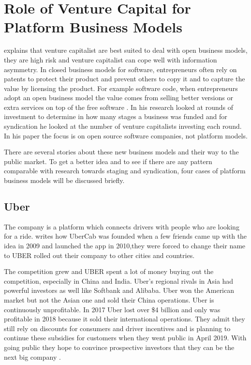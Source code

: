 \documentclass[a4paper, 11pt]{article}
\begin{document}
\section{Role of Venture Capital for Platform Business Models}

\cite{colombo2016open} explains that venture capitalist are best suited to deal with open business models, they are high risk and venture capitalist can cope well with information asymmetry. In closed business models for software, entrepreneurs often rely on patents to protect their product and prevent others to copy it and to capture the value by licensing the product. For example software code, when entrepreneurs adopt an open business model the value comes from selling better versions or extra services on top of the free software \citep{colombo2016open}. In his research \cite{colombo2016open} looked at rounds of investment to determine in how many stages a business was funded and for syndication he looked at the number of venture capitalists investing each round. In his paper the focus is on open source software companies, not platform models.


There are several stories about these new business models and their way to the public market. To get a better idea and to see if there are any pattern comparable with \cite{colombo2016open} research towards staging and syndication, four cases of platform business models will be discussed briefly.


\subsection{Uber}

The company is a platform which connects drivers with people who are looking for a ride. \cite{griswold} writes how UberCab was founded when a few friends came up with the idea in 2009 and launched the app in 2010,they were forced to change their name to UBER rolled out their company to other cities and countries.

The competition grew and UBER spent a lot of money buying out the competition, especially in China and India. Uber’s regional rivals in Asia had powerful investors as well like Softbank and Alibaba. Uber won the American market but not the Asian one and sold their China operations. Uber is continuously unprofitable. In 2017 Uber lost over \$4 billion and only was profitable in 2018 because it sold their international operations. They admit they still rely on discounts for consumers and driver incentives and is planning to continue these subsidies for customers when they went public in April 2019. With going public they hope to convince prospective investors that they can be the next big company \cite{griswold}.
\end{document}
